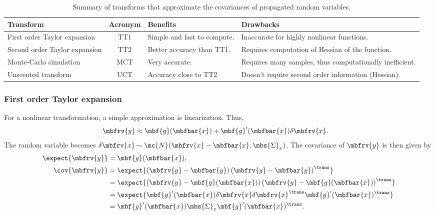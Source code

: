 \begin{table}
    \begin{small}
        \begin{center}
            \begin{tabular}[c]{|l|c|p{}|p{}|}
                \hline
                \textbf{Transform}   &   \textbf{Acronym}   & \textbf{Benefits} & \textbf{Drawbacks}\\
                \hline
                First order Taylor expansion & TT1 & Simple and fast to compute. & Inaccurate for highly nonlinear functions.\\
                \hline
                Second order Taylor expansion & TT2 & Better accuracy than TT1. & Requires computation of Hessian of the function.\\
                \hline
                Monte-Carlo simulation & MCT & Very accurate. & Requires many samples, thus computationally inefficient.\\
                \hline
                Unscented transform & UCT & Accuracy close to TT2 & Doesn't require second order information (Hessian).\\
                \hline
            \end{tabular}
        \end{center}
        \caption{Summary of transforms that approximate the covariances of propagated random variables.}
        \label{tab: summary transforms propagated covariances}
    \end{small}
\end{table}

\subsubsection{First order Taylor expansion}
For a nonlinear transformation, a simple approximation is linearization. Thus, 
\begin{align}
    \mbfrv{y} &\approx \mbf{g}(\mbfbar{x}) + \mbf{g}'(\mbfbar{x})\delta\mbfrv{x}.
\end{align}
The random variable becomes $\delta\mbfrv{x}\sim\mc{N}(\mbfrv{x}-\mbfbar{x},\mbs{\Sigma}_{x})$. The covariance of $\mbfrv{y}$ is then given by
\begin{align}
    \expect{\mbfrv{y}} &= \mbf{g}(\mbfbar{x}),\\
    \cov{\mbfrv{y}} 
    &= \expect{\left(\mbfrv{y}-\mbfbar{y}\right)\left(\mbfrv{y}-\mbfbar{y}\right)^{\trans}}\\
    &= \expect{\left(\mbfrv{y}-\mbf{g}(\mbfbar{x})\right)\left(\mbfrv{y}-\mbf{g}(\mbfbar{x})\right)^{\trans}}\\
    &= \expect{\mbf{g}'(\mbfbar{x})\delta\mbfrv{x}\delta\mbfrv{x}^{\trans}\mbf{g}'(\mbfbar{x})^{\trans}}\\
    &= \mbf{g}'(\mbfbar{x})\mbs{\Sigma}_{x}\mbf{g}'(\mbfbar{x})^{\trans}.
\end{align}


